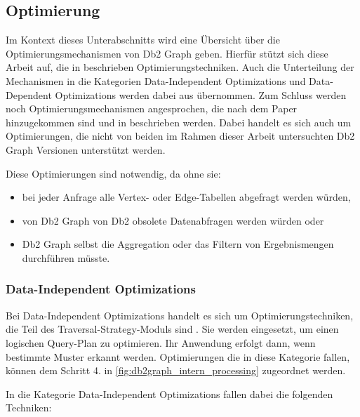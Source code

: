 \subsection{Optimierung}
\label{db2graph:optimierung}

Im Kontext dieses Unterabschnitts wird eine Übersicht über die Optimierungsmechanismen von Db2 Graph geben. Hierfür stützt sich diese Arbeit auf, die in \cite{sigmod_tian} beschrieben Optimierungstechniken. Auch die Unterteilung der Mechanismen in die Kategorien Data-Independent Optimizations und Data-Dependent Optimizations werden dabei aus \cite{sigmod_tian} übernommen. Zum Schluss werden noch Optimierungsmechanismen angesprochen, die nach dem Paper \cite{sigmod_tian} hinzugekommen sind und in \cite{ibm_docs_optimize} beschrieben werden. Dabei handelt es sich auch um Optimierungen, die nicht von beiden im Rahmen dieser Arbeit untersuchten Db2 Graph Versionen unterstützt werden. 

Diese Optimierungen sind notwendig, da ohne sie:

\begin{itemize}
    \item bei jeder Anfrage alle Vertex- oder Edge-Tabellen abgefragt werden würden, 
    \item von Db2 Graph von Db2 obsolete Datenabfragen werden würden oder 
    \item Db2 Graph selbst die Aggregation oder das Filtern von Ergebnismengen durchführen müsste.
\end{itemize}

\subsubsection{Data-Independent Optimizations}
\label{subsubsec:data_independent_optimizations}
Bei Data-Independent Optimizations handelt es sich um Optimierungstechniken, die Teil des Traversal-Strategy-Moduls sind \cite{sigmod_tian}. Sie werden eingesetzt, um einen logischen Query-Plan zu optimieren. Ihr Anwendung erfolgt dann, wenn bestimmte Muster erkannt werden. Optimierungen die in diese Kategorie fallen, können dem Schritt 4. in \autoref{fig:db2graph_intern_processing} zugeordnet werden. 

In die Kategorie Data-Independent Optimizations fallen dabei die folgenden Techniken: 

